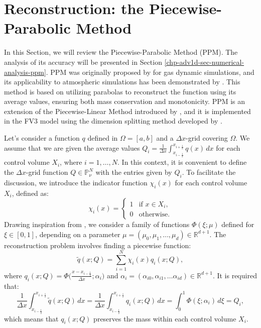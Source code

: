 \section{Reconstruction: the Piecewise-Parabolic Method}
\label{chp-adv1d-sec-recon}
In this Section, we will review the Piecewise-Parabolic Method (PPM).
The analysis of its accuracy will be presented in Section \ref{chp-adv1d-sec-numerical-analysis-ppm}.
PPM was originally proposed by \citet{colella:1984} for gas dynamic simulations, and its applicability
to atmospheric simulations has been demonstrated by \citet{carpenter:1990}.
This method is based on utilizing parabolas to reconstruct the function using its average values,
ensuring both mass conservation and monotonicity. PPM is an extension of the Piecewise-Linear Method
introduced by \citet{vanleer:1977}, and it is implemented in the FV3 model using the dimension
splitting method developed by \citet{lin:1996}.

Let's consider a function ${q}$ defined in $\Omega=[a,b]$ and a $\Delta x$-grid covering $\Omega$.
We assume that we are given the average values ${Q}_i = \frac{1}{\Delta x} \int_{x_{i-\frac{1}{2}}}^{x_{i+\frac{1}{2}}} {q}(x) \,dx$
for each control volume $X_i$, where $i = 1, \ldots, N$.
In this context, it is convenient to define the $\Delta x$-grid function $Q\in \mathbb{P}^{N}_{\nu}$ with the entries given by $Q_i$.
To facilitate the discussion, we introduce the indicator function $\chi_{i}(x)$ for each control volume $X_i$, defined as:
\begin{equation*}
	\label{chp-adv1d-sec3-1-eq1}
	\chi_{i}(x)=
	\begin{cases}
		1 & \text{if } x \in X_i,\\
		0 & \text{otherwise.}
	\end{cases}
\end{equation*}
Drawing inspiration from \citet[Chapter~1]{stoer:2002}, we consider a family of functions $\Phi(\xi;\mu)$
defined for $\xi \in [0,1]$, depending on a parameter $\mu =(\mu_0, \mu_1,\ldots, \mu_d)\in \mathbb{R}^{d+1}$.
The reconstruction problem involves finding a piecewise function:
\begin{equation}
	\label{chp-adv1d-sec3-1-eq2}
	\tilde{q}(x;Q) = \sum_{i=1}^{N} \chi_i(x) q_i(x;Q),
\end{equation}
where $q_i(x;Q) = \Phi\big(\frac{x-x_{i-\frac{1}{2}}}{\Delta x};\alpha_i\big)$ and
$\alpha_i= (\alpha_{i0},\alpha_{i1}, \ldots \alpha_{id})\in\mathbb{R}^{d+1}$. It is required that:
\begin{equation*}
	\frac{1}{\Delta x}\int_{x_{i-\frac{1}{2}}}^{x_{i+\frac{1}{2}}} \tilde{q}(x;Q) \,dx =
	\frac{1}{\Delta x}\int_{x_{i-\frac{1}{2}}}^{x_{i+\frac{1}{2}}} q_i(x;Q) \,dx =
	\int_{0}^{1} \Phi(\xi;\alpha_i) \,d\xi = {Q}_i,
\end{equation*}
which means that $q_i(x;Q)$ preserves the mass within each control volume $X_i$.


